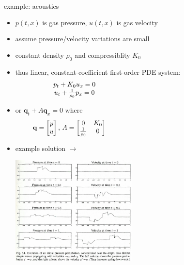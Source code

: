 \documentclass[10pt,hyperref]{beamer}
\newcommand{\bq}{\mathbf{q}}
\begin{document}
\begin{frame}{example: acoustics}

\begin{itemize}
\item $p(t,x)$ is gas pressure, $u(t,x)$ is gas velocity
\item assume pressure/velocity variations are small
\item constant density $\rho_0$ and compressiblity $K_0$
\item thus linear, constant-coefficient first-order PDE system:
$$\begin{matrix} p_t + K_0 u_x = 0 \\ u_t + \frac{1}{\rho_0} p_x = 0 \end{matrix} \hspace{60mm}$$
\item or $\bq_t + A \bq_x=0$ where
$$\bq = \begin{bmatrix} p \\ u \end{bmatrix}, \, A = \begin{bmatrix} 0 & K_0 \\ \frac{1}{\rho_0} & 0 \end{bmatrix} \hspace{65mm}$$
\item example solution $\longrightarrow$

\vspace{-30mm}
\hfill \includegraphics[width=0.5\textwidth]{figs/leveque3p1}
\end{itemize}
\end{frame}
\end{document}
